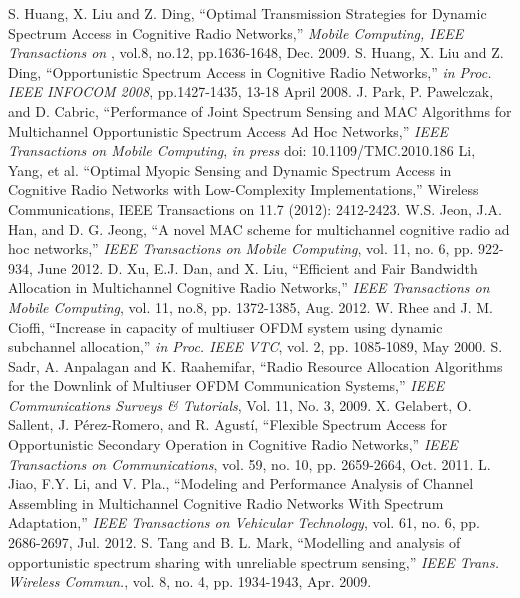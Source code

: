 \begin{thebibliography}{}
 S. Huang, X. Liu and Z. Ding, ``Optimal Transmission Strategies for Dynamic Spectrum Access in Cognitive Radio Networks,'' \emph{Mobile Computing, IEEE Transactions on }, vol.8, no.12, pp.1636-1648, Dec. 2009.
 S. Huang, X. Liu and Z. Ding, ``Opportunistic Spectrum Access in Cognitive Radio Networks,'' \emph{in Proc. IEEE INFOCOM 2008}, pp.1427-1435, 13-18 April 2008.
 J. Park, P. Pawelczak, and D. Cabric, ``Performance of Joint Spectrum Sensing and MAC Algorithms for Multichannel Opportunistic Spectrum Access Ad Hoc Networks,'' \emph{ IEEE Transactions on Mobile Computing}, \textit{in press} doi: 10.1109/TMC.2010.186
 Li, Yang, et al. ``Optimal Myopic Sensing and Dynamic Spectrum Access in Cognitive Radio Networks with Low-Complexity Implementations,'' Wireless Communications, IEEE Transactions on 11.7 (2012): 2412-2423.
 W.S. Jeon, J.A. Han, and D. G. Jeong, ``A novel MAC scheme for multichannel cognitive radio ad hoc networks,'' \emph{IEEE Transactions on Mobile Computing}, vol. 11, no. 6, pp. 922-934, June 2012.
 D. Xu, E.J. Dan, and X. Liu, ``Efficient and Fair Bandwidth Allocation in Multichannel Cognitive Radio Networks,'' \emph{IEEE Transactions on Mobile Computing}, vol. 11, no.8, pp. 1372-1385, Aug. 2012.
 W. Rhee and J. M. Cioffi, ``Increase in capacity of multiuser OFDM
system using dynamic subchannel allocation,'' \emph{in Proc. IEEE VTC}, vol. 2, pp. 1085-1089, May 2000.
 S. Sadr, A. Anpalagan and K. Raahemifar, ``Radio Resource Allocation Algorithms for the Downlink of Multiuser OFDM Communication Systems,'' \emph{IEEE Communications Surveys \& Tutorials}, Vol. 11, No. 3, 2009.
X. Gelabert, O. Sallent, J. Pérez-Romero, and R. Agustí, ``Flexible Spectrum Access for Opportunistic Secondary Operation in Cognitive Radio Networks,'' \emph{IEEE Transactions on Communications}, vol. 59, no. 10, pp. 2659-2664, Oct. 2011.
L. Jiao, F.Y. Li, and V. Pla., ``Modeling and Performance Analysis of Channel Assembling in Multichannel Cognitive Radio Networks With Spectrum Adaptation,'' \emph{IEEE Transactions on Vehicular Technology}, vol. 61, no. 6, pp. 2686-2697, Jul. 2012.
 S. Tang and B. L. Mark, ``Modelling and analysis of opportunistic spectrum sharing with unreliable spectrum sensing,'' \emph{IEEE Trans. Wireless Commun.}, vol. 8, no. 4, pp. 1934-1943, Apr. 2009.

\end{thebibliography}
